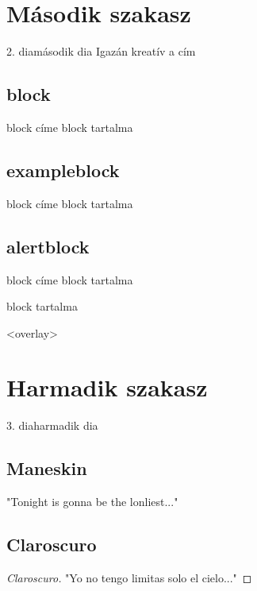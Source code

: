 \documentclass[aspectratio=169,12pt,fragile,allowframebreaks]{beamer}
\begin{document}
\section{Második szakasz}
\begin{frame}{2. dia}{második dia}
\pause
Igazán kreatív a cím
\subsection{block}
\begin{block}{block címe}
block tartalma
\end{block}
\pause
\subsection{exampleblock}
\begin{exampleblock}{block címe}
block tartalma
\end{exampleblock}
\subsection{alertblock}
\begin{alertblock}{block címe}
block tartalma
\end{alertblock}
\begin{alertblock}
block tartalma
\end{alertblock}
\end{frame}

\transdissolve<overlay>

\section{Harmadik szakasz}
\begin{frame}{3. dia}{harmadik dia}
\subsection{Maneskin}
\begin{theorem}[Maneskin]
"Tonight is gonna be the lonliest..."
\end{theorem}

\subsection{Claroscuro}
\begin{proof}[Claroscuro]
"Yo no tengo limitas solo el cielo..."
\end{proof}
\end{frame}
\end{document}
